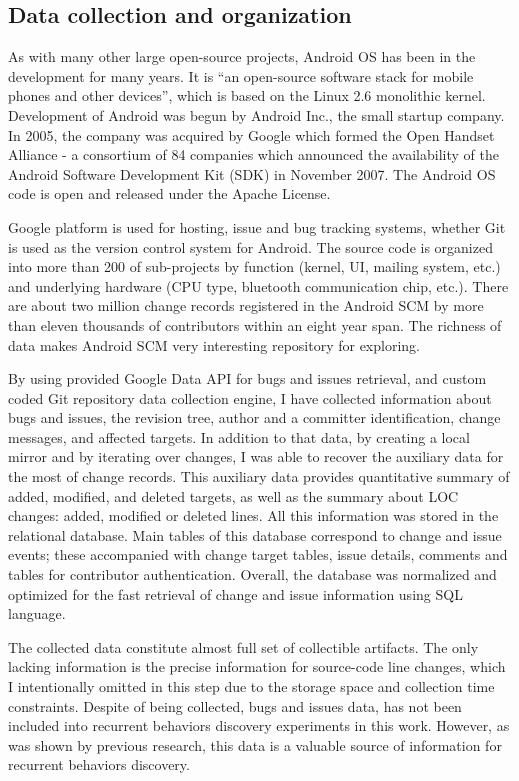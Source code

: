 \documentclass[conference]{worldcomp}
\begin{document}
\subsection{Data collection and organization}
As with many other large open-source projects, Android OS has been in the development for many years. 
It is ``an open-source software stack for mobile phones and other 
devices'', which is based on the Linux 2.6 monolithic kernel.
Development of Android was begun by Android Inc., the small startup company.
In 2005, the company was acquired by Google which formed the Open Handset Alliance - a consortium of 84 companies 
which announced the availability of the Android Software Development Kit (SDK) 
in November 2007. The Android OS code is open and released under the Apache License.

Google platform is used for hosting, issue and bug tracking systems, whether Git is used 
as the version control system for Android. The source code is organized 
into more than 200 of sub-projects by function (kernel, UI, mailing system, etc.) 
and underlying hardware (CPU type, bluetooth communication chip, etc.). 
There are about two million change records registered in the Android SCM by more than 
eleven thousands of contributors within an eight year span. The richness of data 
makes Android SCM very interesting repository for exploring.

By using provided Google Data API for bugs and issues retrieval, and custom coded
Git repository data collection engine, I have collected information about bugs and issues,
the revision tree, author and a committer identification, change messages, and affected targets. 
In addition to that data, by creating a local mirror and by iterating over changes, I was able 
to recover the auxiliary data for the most of change records. This auxiliary data provides quantitative
summary of added, modified, and deleted targets, as well as the summary about LOC changes: 
added, modified or deleted lines. All this information 
was stored in the relational database. Main tables of this database correspond to change 
and issue events; these accompanied with change target tables, issue details, comments and 
tables for contributor authentication. Overall, the database was normalized and optimized 
for the fast retrieval of change and issue information using SQL language.

The collected data constitute almost full set of collectible artifacts. 
The only lacking information is the precise information for source-code line changes, which I 
intentionally omitted in this step due to the storage space and collection time constraints. 
Despite of being collected, bugs and issues data, has not been included into recurrent 
behaviors discovery experiments in this work. However, as was shown by previous research, 
this data is a valuable source of information for recurrent behaviors discovery.
\end{document}
